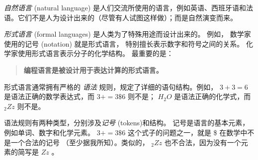 {\em 自然语言} (natural language) 是人们交流所使用的语言，例如英语、西班牙语和法语。它们不是人为设计出来的（尽管有人试图这样做）；而是自然演变而来。


{\em 形式语言} (formal languages) 是人类为了特殊用途而设计出来的。 例如， 数学家使用的记号 (notation) 就是形式语言， 特别擅长表示数字和符号之间的关系。 化学家使用形式语言表示分子的化学结构。 最重要的是：


\begin{quote}
\textbf{编程语言是被设计用于表达计算的形式语言。}
\end{quote}


形式语言通常拥有严格的 {\em 语法} 规则，规定了详细的语句结构。例如， $3 + 3 = 6$ 是语法正确的数学表达式，而 $3 + = 3 \$ 6$ 则不是； $H_2O$ 是语法正确的化学式，而 $_2Zz$ 则不是。
  


语法规则有两种类型，分别涉及{\em 记号} (tokens)和结构。  记号是语言的基本元素，例如单词、数字和化学元素。  $3 + = 3 \$ 6$ 这个式子的问题之一，就是 \$ 在数学中不是一个合法的记号 （至少据我所知）。类似的， $_2Zz$ 也不合法，因为没有一个元素的简写是  $Zz$ 。
  

